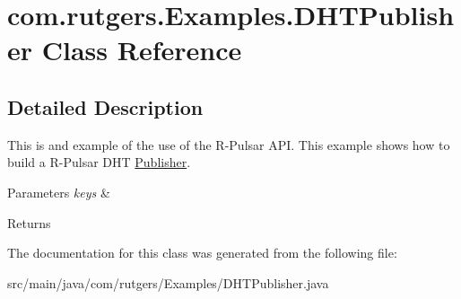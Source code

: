 \hypertarget{classcom_1_1rutgers_1_1Examples_1_1DHTPublisher}{}\section{com.\+rutgers.\+Examples.\+D\+H\+T\+Publisher Class Reference}
\label{classcom_1_1rutgers_1_1Examples_1_1DHTPublisher}


\subsection{Detailed Description}
This is and example of the use of the R-\/\+Pulsar A\+PI. This example shows how to build a R-\/\+Pulsar D\+HT \hyperlink{classcom_1_1rutgers_1_1Examples_1_1Publisher}{Publisher}. 
\begin{DoxyParams}{Parameters}
{\em keys} & \\
\hline
\end{DoxyParams}
\begin{DoxyReturn}{Returns}

\end{DoxyReturn}


The documentation for this class was generated from the following file\+:\begin{DoxyCompactItemize}
\item 
src/main/java/com/rutgers/\+Examples/D\+H\+T\+Publisher.\+java\end{DoxyCompactItemize}
